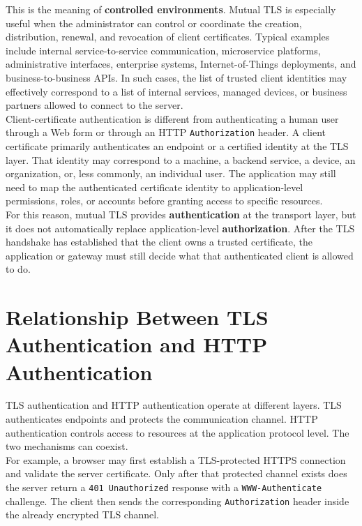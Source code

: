 \documentclass{scrbook}
\begin{document}
This is the meaning of \textbf{controlled environments}. Mutual TLS is especially useful when the administrator can control or coordinate the creation, distribution, renewal, and revocation of client certificates. Typical examples include internal service-to-service communication, microservice platforms, administrative interfaces, enterprise systems, Internet-of-Things deployments, and business-to-business APIs. In such cases, the list of trusted client identities may effectively correspond to a list of internal services, managed devices, or business partners allowed to connect to the server.\\

Client-certificate authentication is different from authenticating a human user through a Web form or through an HTTP \texttt{Authorization} header. A client certificate primarily authenticates an endpoint or a certified identity at the TLS layer. That identity may correspond to a machine, a backend service, a device, an organization, or, less commonly, an individual user. The application may still need to map the authenticated certificate identity to application-level permissions, roles, or accounts before granting access to specific resources.\\

For this reason, mutual TLS provides \textbf{authentication} at the transport layer, but it does not automatically replace application-level \textbf{authorization}. After the TLS handshake has established that the client owns a trusted certificate, the application or gateway must still decide what that authenticated client is allowed to do.

\section{Relationship Between TLS Authentication and HTTP Authentication}

TLS authentication and HTTP authentication operate at different layers. TLS authenticates endpoints and protects the communication channel. HTTP authentication controls access to resources at the application protocol level. The two mechanisms can coexist.\\

For example, a browser may first establish a TLS-protected HTTPS connection and validate the server certificate. Only after that protected channel exists does the server return a \texttt{401 Unauthorized} response with a \texttt{WWW-Authenticate} challenge. The client then sends the corresponding \texttt{Authorization} header inside the already encrypted TLS channel.
\end{document}
